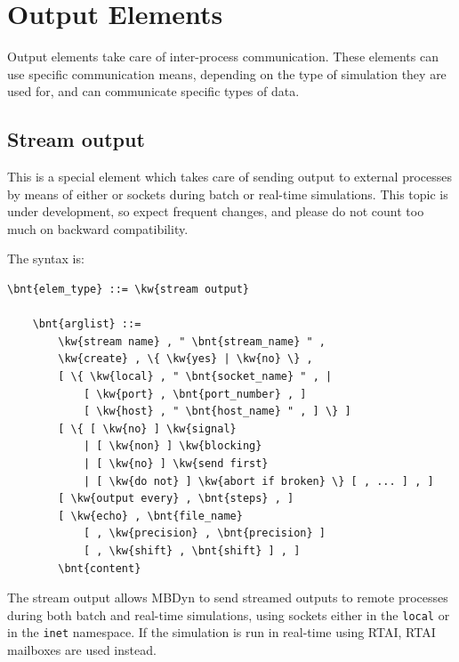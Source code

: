 \section{Output Elements}
Output elements take care of inter-process communication.
These elements can use specific communication means,
depending on the type of simulation they are used for,
and can communicate specific types of data.

\subsection{Stream output}\label{sec:EL:OUTELEM:STREAM_OUTPUT}
This is a special element which takes care of sending output
to external processes by means of either  or  sockets
during batch or real-time simulations.
This topic is under development, so expect frequent changes, and
please do not count too much on backward compatibility.

The syntax is:
\begin{Verbatim}[commandchars=\\\{\}]
    \bnt{elem_type} ::= \kw{stream output}

    \bnt{arglist} ::=
        \kw{stream name} , " \bnt{stream_name} " ,
        \kw{create} , \{ \kw{yes} | \kw{no} \} ,
        [ \{ \kw{local} , " \bnt{socket_name} " , |
            [ \kw{port} , \bnt{port_number} , ]
            [ \kw{host} , " \bnt{host_name} " , ] \} ]
        [ \{ [ \kw{no} ] \kw{signal}
            | [ \kw{non} ] \kw{blocking}
            | [ \kw{no} ] \kw{send first}
            | [ \kw{do not} ] \kw{abort if broken} \} [ , ... ] , ]
        [ \kw{output every} , \bnt{steps} , ]
        [ \kw{echo} , \bnt{file_name}
            [ , \kw{precision} , \bnt{precision} ]
            [ , \kw{shift} , \bnt{shift} ] , ]
        \bnt{content}
\end{Verbatim}
The stream output allows MBDyn to send streamed outputs 
to remote processes during both batch and real-time simulations,
using sockets either in the \texttt{local} or in the \texttt{inet} namespace.
If the simulation is run in real-time using RTAI, RTAI mailboxes
are used instead.

